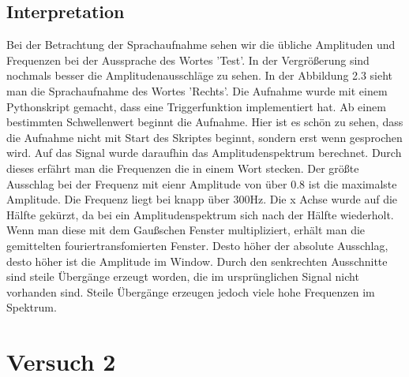 \documentclass[12pt, oneside, a4paper, \docLanguage]{report}
\begin{document}
\section{Interpretation}
\label{chap:VERSUCH_1_INTERPRETATION}
Bei der Betrachtung der Sprachaufnahme sehen wir die übliche Amplituden und Frequenzen bei der Aussprache des Wortes 'Test'.
In der Vergrößerung sind nochmals besser die Amplitudenausschläge zu sehen.
\newline 
\newline
In der Abbildung 2.3 sieht man die Sprachaufnahme des Wortes 'Rechts'.
Die Aufnahme wurde mit einem Pythonskript gemacht, dass eine Triggerfunktion implementiert hat.
Ab einem bestimmten Schwellenwert beginnt die Aufnahme. Hier ist es schön zu sehen, dass die Aufnahme nicht mit Start des Skriptes beginnt, sondern erst wenn gesprochen wird. 
\newline 
\newline
Auf das Signal wurde daraufhin das Amplitudenspektrum berechnet. Durch dieses erfährt man die Frequenzen die in einem Wort stecken.
Der größte Ausschlag bei der Frequenz mit eienr Amplitude von über 0.8 ist die maximalste Amplitude. Die Frequenz liegt bei knapp über 300Hz.
Die x Achse wurde  auf die Hälfte gekürzt, da bei ein Amplitudenspektrum sich nach der Hälfte wiederholt.
\newline
\newline
Wenn man diese mit dem Gaußschen Fenster multipliziert, erhält man die gemittelten fouriertransfomierten Fenster.
Desto höher der absolute Ausschlag, desto höher ist die Amplitude im Window. Durch den senkrechten Ausschnitte sind steile Übergänge erzeugt
worden, die im ursprünglichen Signal nicht vorhanden sind. 
Steile Übergänge erzeugen jedoch viele hohe Frequenzen im Spektrum.
%
%
\chapter{Versuch 2}
\label{chap:VERSUCH_2}
\end{document}
